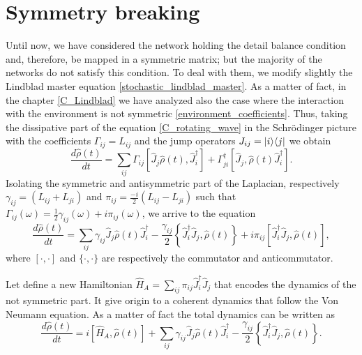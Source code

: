 \begin{comment}
If the previous condition are satisfy the stationary distribution of the system is the canonical one. In our case it becomes
\begin{equation}
\hat\rho^* = \frac{e^{-\beta\hat L}}{Z} \qquad Z = \Tr[e^{-\beta\hat L}]  
\end{equation}
that is the density matrix \eqref{density_matrix} introduced by De Domenico to identify networks.
\end{comment}

\newpage
\section{Symmetry breaking}

Until now, we have considered the network holding the detail balance condition and, therefore, be mapped in a symmetric matrix; 
but the majority of the networks do not satisfy this condition. To deal with them, we modify slightly the Lindblad master equation \eqref{stochastic_lindblad_master}. 
As a matter of fact, in the chapter \ref{C_Lindblad} we have analyzed also the case where the interaction with the environment is not symmetric \eqref{environment_coefficients}. Thus, taking the dissipative part of the equation \eqref{C_rotating_wave} in the Schrödinger picture with the coefficients $\Gamma_{ij} = L_{ij}$ and the jump operators $J_{ij} = \lvert i\rangle\langle j\rvert$ we obtain 
\begin{equation}
    \frac{d\hat\rho(t)}{dt} = \sum_{ij}\Gamma_{ij}\left[\hat J_j\hat\rho(t),\hat J_i^\dagger\right]+\Gamma_{ji}^\dagger\left[\hat J_j,\hat\rho(t)\hat J_i^\dagger\right].
\end{equation}
Isolating the symmetric and antisymmetric part of the Laplacian, respectively $\gamma_{ij} = \left(L_{ij} + L_{ji}\right)$ and $\pi_{ij} =  \frac{-i}{2}\left(L_{ij}-L_{ji}\right)$ such that $\Gamma_{ij}(\omega) =\frac{1}{2}\gamma_{ij}(\omega)+i\pi_{ij}(\omega)$, we arrive to the equation
\begin{equation}
    \frac{d\hat\rho(t)}{dt} = \sum_{ij}\gamma_{ij}\hat J_j\hat\rho(t)\hat J_i^\dagger -\frac{\gamma_{ij}}{2}\left\{\hat J_i^\dagger\hat J_j,\hat\rho(t)\right\} + i\pi_{ij}\left[\hat J_i^\dagger\hat J_j,\hat\rho(t)\right],
\end{equation}
where $[\cdot,\cdot]$ and $\{\cdot,\cdot\}$ are respectively the commutator and anticommutator.

Let define a new Hamiltonian $\hat H_{A} = \sum_{ij}\pi_{ij}\hat J_i^\dagger\hat J_j$ that encodes the dynamics of the not symmetric part. 
It give origin to a coherent dynamics that follow the Von Neumann equation. As a matter of fact the total dynamics can be written as
\begin{equation}\label{antisymmetric_master_equation}
    \frac{d\hat\rho(t)}{dt} = i\left[\hat H_{A},\hat\rho(t)\right] + \sum_{ij}\gamma_{ij}\hat J_j\hat\rho(t)\hat J_i^\dagger -\frac{\gamma_{ij}}{2}\left\{\hat J_i^\dagger\hat J_j,\hat\rho(t)\right\}.
\end{equation}

